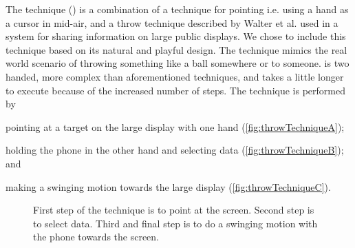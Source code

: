 The \throw technique () is a combination of a technique for pointing \cite{Scheible:2008} i.e. using a hand as a cursor in mid-air, and a throw technique described by Walter et al. \cite{Walter:2014} used in a system for sharing information on large public displays.
We chose to include this technique based on its natural and playful design.
The technique mimics the real world scenario of throwing something like a ball somewhere or to someone.
\throw is two handed, more complex than aforementioned techniques, and takes a little longer to execute because of the increased number of steps.
The \throw technique is performed by 
\begin{enumerate*}[label=\itshape\arabic*\upshape)]
	\item{pointing at a target on the large display with one hand (\cref{fig:throwTechniqueA});}
	\item{holding the phone in the other hand and selecting data (\cref{fig:throwTechniqueB}); and}
	\item{making a swinging motion towards the large display (\cref{fig:throwTechniqueC}).}
\end{enumerate*}

\begin{figure}[H]
\caption{\protect{} First step of the \throw technique is to point at the screen. \protect{} Second step is to select data. \protect{} Third and final step is to do a swinging motion with the phone towards the screen.}
\label{fig:throwTechnique}
\end{figure}

